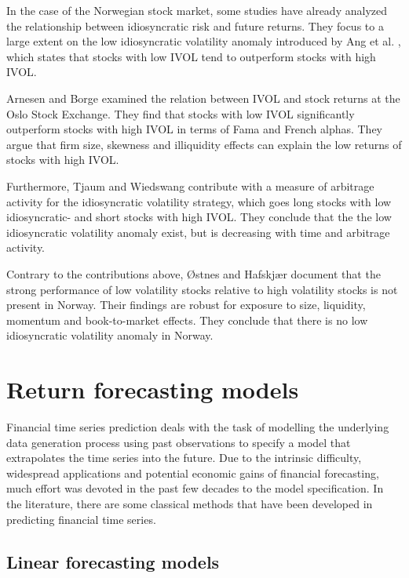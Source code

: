 In the case of the Norwegian stock market, some studies have already analyzed the relationship between idiosyncratic risk and future returns. They focus to a large extent on the low idiosyncratic volatility anomaly introduced by Ang et al. \cite{angetal06}, which states that stocks with low IVOL tend to outperform stocks with high IVOL. 

Arnesen and Borge \cite{arnborge} examined the relation between IVOL and stock returns at the Oslo Stock Exchange. They find that stocks with low IVOL significantly outperform stocks with high IVOL in terms of Fama and French \cite{famafrench} alphas. They argue that firm size, skewness and illiquidity effects can explain the low returns of stocks with high IVOL.

Furthermore, Tjaum and Wiedswang \cite{thaumwiedswang} contribute with a measure of arbitrage activity for the idiosyncratic volatility strategy, which goes long stocks with low idiosyncratic- and short stocks with high IVOL. They conclude that the the low idiosyncratic volatility anomaly exist, but is decreasing with time and arbitrage activity. 

Contrary to the contributions above, Østnes and Hafskjær \cite{ostnes} document that the strong performance of low volatility stocks relative to high volatility stocks is not present in Norway. Their findings are robust for exposure to size, liquidity, momentum and book-to-market effects. They conclude that there is no low idiosyncratic volatility anomaly in Norway.


\section{Return forecasting models}

Financial time series prediction deals with the task of modelling the underlying data generation process using past observations to specify a model that extrapolates the time series into the future. Due to the intrinsic difficulty, widespread applications and potential economic gains of financial forecasting, much effort was devoted in the past few decades to the model specification. In the literature, there are some classical methods that have been developed in predicting financial time series. 

\subsection{Linear forecasting models}

